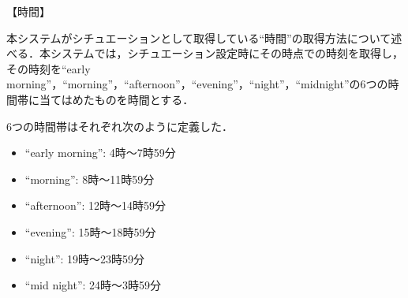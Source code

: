 【時間】
\par 本システムがシチュエーションとして取得している“時間”の取得方法について述べる．本システムでは，シチュエーション設定時にその時点での時刻を取得し，その時刻を“early morning”，“morning”，“afternoon”，“evening”，“night”，“midnight”の6つの時間帯に当てはめたものを時間とする．
\par 6つの時間帯はそれぞれ次のように定義した．
\begin{itemize}
 \item “early morning”: 4時～7時59分
 \item “morning”: 8時～11時59分
 \item “afternoon”: 12時～14時59分
 \item “evening”: 15時～18時59分
 \item “night”: 19時～23時59分
 \item “mid night”: 24時～3時59分
\end{itemize}

